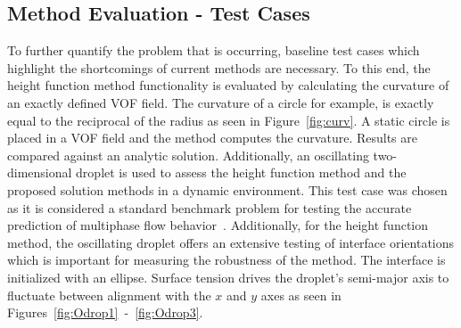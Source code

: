 \subsection{Method Evaluation - Test Cases}
To further quantify the problem that is occurring, baseline test cases which highlight the shortcomings of current methods are necessary. To this end, the height function method functionality is evaluated by calculating the curvature of an exactly defined VOF field. The curvature of a circle for example, is exactly equal to the reciprocal of the radius as seen in Figure~\ref{fig:curv}. A static circle is placed in a VOF field and the method computes the curvature. Results are compared against an analytic solution. Additionally, an oscillating two-dimensional droplet is used to assess the height function method and the proposed solution methods in a dynamic environment. This test case was chosen as it is considered a standard benchmark problem for testing the accurate prediction of multiphase flow behavior~\cite{Salih2002}. Additionally, for the height function method, the oscillating droplet offers an extensive testing of interface orientations which is important for measuring the robustness of the method. The interface is initialized with an ellipse. Surface tension drives the droplet's semi-major axis to fluctuate between alignment with the $x$ and $y$ axes as seen in Figures~\ref{fig:Odrop1}~-~\ref{fig:Odrop3}. 
